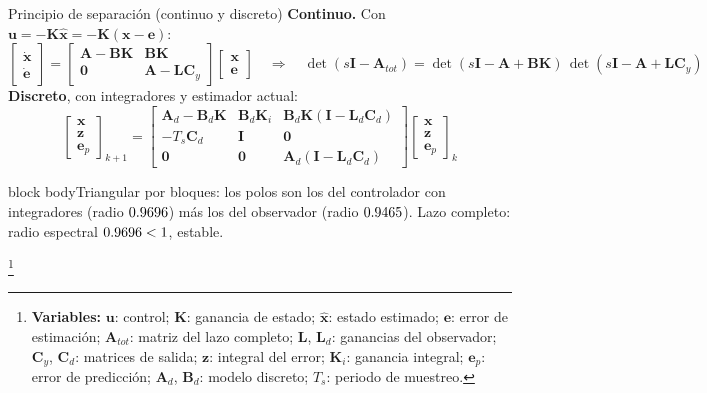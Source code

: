 \documentclass[aspectratio=169,10pt]{beamer}
\newcommand{\vect}[1]{\bm{#1}}
\newcommand{\variables}[1]{\begingroup\renewcommand{\thefootnote}{}\footnote[frame]{\textbf{Variables:} #1}\addtocounter{footnote}{-1}\endgroup}
\newcommand{\resultado}[1]{\par\smallskip\begin{beamercolorbox}[rounded=true,sep=0.45em,center]{block body}#1\end{beamercolorbox}\par\smallskip}
\begin{document}
\begin{frame}{Principio de separación (continuo y discreto)}
\small
\textbf{Continuo.} Con $\vect u = -\vect K\hat{\vect x} = -\vect K(\vect x - \vect e)$:
\[
\begin{bmatrix}\dot{\vect x}\\ \dot{\vect e}\end{bmatrix} = \begin{bmatrix}\vect A - \vect B\vect K & \vect B\vect K\\ \vect 0 & \vect A - \vect L\vect C_y\end{bmatrix}\begin{bmatrix}\vect x\\ \vect e\end{bmatrix}
\quad\Rightarrow\quad
\det(s\vect I - \vect A_{tot}) = \det(s\vect I - \vect A + \vect B\vect K)\,\det(s\vect I - \vect A + \vect L\vect C_y)
\]
\textbf{Discreto}, con integradores y estimador actual:
\[
\begin{bmatrix}\vect x\\ \vect z\\ \vect e_p\end{bmatrix}_{k+1} =
\begin{bmatrix}
\vect A_d - \vect B_d\vect K & \vect B_d\vect K_i & \vect B_d\vect K(\vect I - \vect L_d\vect C_d)\\
-T_s\vect C_d & \vect I & \vect 0\\
\vect 0 & \vect 0 & \vect A_d(\vect I - \vect L_d\vect C_d)
\end{bmatrix}
\begin{bmatrix}\vect x\\ \vect z\\ \vect e_p\end{bmatrix}_k
\]
\resultado{Triangular por bloques: los polos son los del controlador con integradores (radio $0.9696$) más los del observador (radio $0.9465$). Lazo completo: radio espectral $0.9696 < 1$, estable.}
\variables{$\vect u$: control; $\vect K$: ganancia de estado; $\hat{\vect x}$: estado estimado; $\vect e$: error de estimación; $\vect A_{tot}$: matriz del lazo completo; $\vect L$, $\vect L_d$: ganancias del observador; $\vect C_y$, $\vect C_d$: matrices de salida; $\vect z$: integral del error; $\vect K_i$: ganancia integral; $\vect e_p$: error de predicción; $\vect A_d$, $\vect B_d$: modelo discreto; $T_s$: periodo de muestreo.}
\end{frame}

\end{document}
